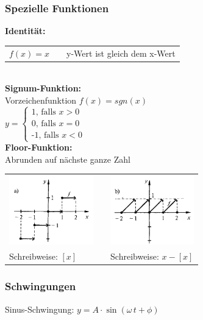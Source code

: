 		\subsubsection{Spezielle Funktionen}
			\textbf{Identität:} \\
				\begin{tabular}{lll}
					$f(x) = x$ & &  y-Wert ist gleich dem x-Wert 
				\end{tabular}
			\\
			\textbf{Signum-Funktion:} \\
				Vorzeichenfunktion $f(x)=sgn(x)$\\
				$y= \left\{\begin{array}{l}\text{1, falls $x>0$} \\
					                       \text{0, falls $x=0$} \\
					                       \text{-1, falls $x<0$}\end{array}\right.$
			\\	
			\textbf{Floor-Funktion:} \\
			 	Abrunden auf nächste ganze Zahl \\
			
				\begin{tabular}{lll}
					\includegraphics[height=3cm]{Bilder/floor-funktion} & &  \includegraphics[height=3cm]{Bilder/saegezahn-funktion} \\
					Schreibweise: \textbf{$[x]$}                        & &  Schreibweise: \textbf{$x - [x]$} \\
				\end{tabular}
			
		\subsubsection{Schwingungen}
			Sinus-Schwingung:  $y = A \cdot \sin(\omega \, t + \phi)$ \\
			
